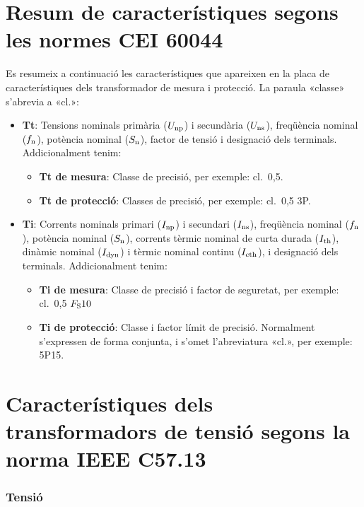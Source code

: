 \section{Resum de característiques segons les normes CEI 60044}

Es resumeix a continuació les característiques que apareixen en la placa de característiques dels transformador de mesura i protecció. La paraula
«classe» s'abrevia a «cl.»:

\begin{itemize}
   \item \textbf{Tt}: Tensions nominals  primària ($U_\mathrm{np}$) i secundària ($U_\mathrm{ns}$), freqüència nominal ($f_\mathrm{n}$),
    potència nominal ($S_\mathrm{n}$), factor de tensió i     designació dels terminals. Addicionalment tenim:
       \begin{itemize}
           \item \textbf{Tt de mesura}: Classe de precisió, per  exemple: cl.~0,5.
           \item \textbf{Tt de protecció}: Classes de precisió, per  exemple: cl.~0,5 3P.
        \end{itemize}
    \item \textbf{Ti}: Corrents nominals primari ($I_\mathrm{np}$) i secundari ($I_\mathrm{ns}$), freqüència nominal ($f_\mathrm{n}$),
     potència nominal ($S_\mathrm{n}$),  corrents tèrmic nominal de curta durada ($I_\mathrm{th}$), dinàmic nominal ($I_\mathrm{dyn}$) i tèrmic nominal continu ($I_\mathrm{cth}$), i     designació dels terminals. Addicionalment tenim:
        \begin{itemize}
           \item \textbf{Ti de mesura}: Classe de precisió i factor de seguretat, per exemple: cl.~0,5 $F_\mathrm{S} 10$
           \item \textbf{Ti de protecció}: Classe i factor límit de precisió. Normalment s'expressen de forma conjunta, i s'omet l'abreviatura «cl.»,  per exemple: 5P15.
        \end{itemize}
\end{itemize}


\section{Característiques dels transformadors de tensió segons la norma IEEE C57.13}

\subsubsection{Tensió}

